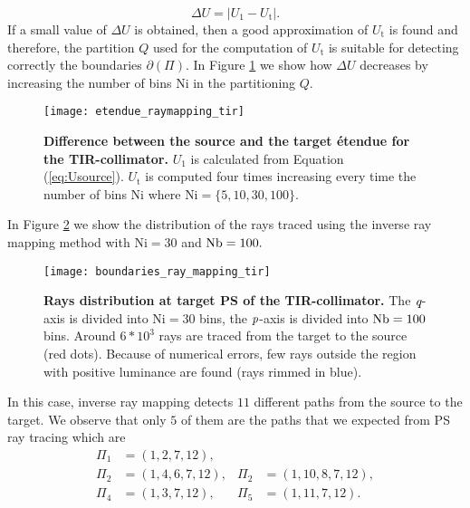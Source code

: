 \begin{equation}\label{eq:delta_raymapping}
\Delta U =  \big|U_1-U_{\textrm{t}}\big|.
\end{equation}
If a small value of $\Delta U$ is obtained, then a good approximation of $U_{\textrm{t}}$ is found and therefore, the partition $Q$ used for the computation of $U_{\textrm{t}}$ is suitable for detecting correctly the boundaries $\partial$$(\Pi)$. In Figure \ref{fig:etendue_raymapping_tir} we show how $\Delta U$ decreases by increasing the number of bins $\textrm{Ni}$ in the partitioning $Q$.  
\begin{figure}[h]
  \begin{center}
  \texttt{[image: etendue\_raymapping\_tir]}
  \end{center}
  \caption{\textbf{Difference between the source and the target \'{e}tendue for the TIR-collimator.}
 $U_1$ is calculated from Equation (\ref{eq:Usource}). $U_{\textrm{t}}$ is computed four times increasing every time the number of bins $\textrm{Ni}$ where $\textrm{Ni}=\{5,10,30,100\}$. }
\label{fig:etendue_raymapping_tir}
 \end{figure}
In Figure \ref{fig:boundaries_TIR_ray_mapping} we show the distribution of the rays traced using the inverse ray mapping method with $\textrm{Ni}=30$ and $\textrm{Nb} = 100.$ 
\begin{figure}[h]
  \begin{center}
  \texttt{[image: boundaries\_ray\_mapping\_tir]}
  \end{center}
  \caption{\textbf{Rays distribution at target PS of the TIR-collimator.}
 The $\textit{q}$-axis is divided into $\textrm{Ni}=30$ bins, the $\textit{p}$-axis is divided into $\textrm{Nb} = 100$ bins. Around $6*10^3$ rays are traced from the target to the source (red dots). Because of numerical errors, few rays outside the region with positive luminance are found (rays rimmed in blue).}
\label{fig:boundaries_TIR_ray_mapping}
 \end{figure}
In this case, inverse ray mapping detects $11$ different paths from the source to the target. 
We observe that only $5$ of them are the paths that we expected from PS ray tracing which are
\begin{equation}\label{eq:paths_tir}
\begin{array}{llll}
\Pi_1&=(1,2,7,12), \\
\Pi_2&=(1,4,6,7,12), & \Pi_2&=(1,10,8,7,12),\\
\Pi_4&=(1,3,7,12), & \Pi_5&=(1,11,7,12).
\end{array}\end{equation}
